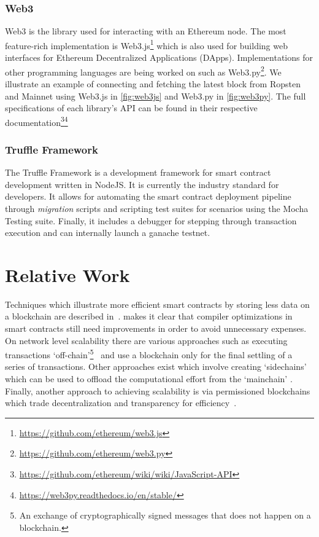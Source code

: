 \subsubsection{Web3}
Web3 is the library used for interacting with an Ethereum node. The most feature-rich implementation is Web3.js\footnote{\url{https://github.com/ethereum/web3.js}} which is also used for building web interfaces for Ethereum Decentralized Applications (DApps). Implementations for other programming languages are being worked on such as Web3.py\footnote{\url{https://github.com/ethereum/web3.py}}. We illustrate an example of connecting and fetching the latest block from Ropsten and Mainnet using Web3.js in \ref{fig:web3js} and Web3.py in \ref{fig:web3py}. The full specifications of each library's API can be found in their respective documentation\footnote{\url{https://github.com/ethereum/wiki/wiki/JavaScript-API}}\footnote{\url{https://web3py.readthedocs.io/en/stable/}}


\subsubsection{Truffle Framework}
The Truffle Framework is a development framework for smart contract development written in NodeJS. It is currently the industry standard for developers. It allows for automating the smart contract deployment pipeline through \textit{migration} scripts and scripting test suites for scenarios using the Mocha Testing suite. Finally, it includes a debugger for stepping through transaction execution and can internally launch a ganache testnet.

\section{Relative Work}
Techniques which illustrate more efficient smart contracts by storing less data on a blockchain are described in~\cite{stateless}. \cite{DBLP:journals/corr/ChenLLZ17} makes it clear that compiler optimizations in smart contracts still need improvements in order to avoid unnecessary expenses. On network level scalability there are various approaches such as executing transactions `off-chain'\footnote{An exchange of cryptographically signed messages that does not happen on a blockchain.}~\cite{raiden, funfair, counterfactual} and use a blockchain only for the final settling of a series of transactions. Other approaches exist which involve creating `sidechains' which can be used to offload the computational effort from the `mainchain' \cite{sidechains, loom, cosmos, plasmacash, plasma}. Finally, another approach to achieving scalability is via permissioned blockchains which trade decentralization and transparency for efficiency~\cite{hyperledger, Vukolic:2017:RPB:3055518.3055526}.

